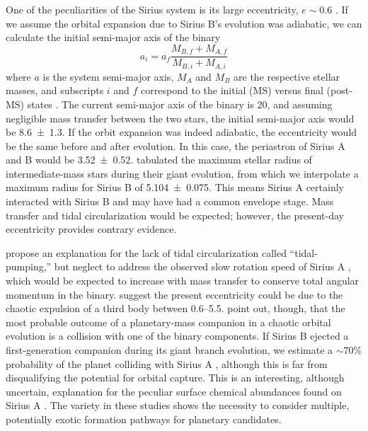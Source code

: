 \documentclass[twocolumn]{aastex631}
\begin{document}
One of the peculiarities of the Sirius system is its large eccentricity, $e\sim0.6$ \citep{bondSiriusSystemIts2017}. If we assume the orbital expansion due to Sirius B's evolution was adiabatic, we can calculate the initial semi-major axis of the binary
\begin{equation}
    a_i = a_f \frac{M_{B,f} + M_{A,f}}{M_{B,i} + M_{A,i}}
\end{equation}
where $a$ is the system semi-major axis, $M_A$ and $M_B$ are the respective stellar masses, and subscripts $i$ and $f$ correspond to the initial (MS) versus final (post-MS) states \citep{jeansCosmogonicProblemsAssociated1924}. The current semi-major axis of the binary is \qty{20}{\au}, and assuming negligible mass transfer between the two stars, the initial semi-major axis would be \qty{8.6\pm1.3}{\au}. If the orbit expansion was indeed adiabatic, the eccentricity would be the same before and after evolution. In this case, the periastron of Sirius A and B would be \qty{3.52\pm0.52}{\au}. \citet{verasPostmainsequencePlanetarySystem2016} tabulated the maximum stellar radius of intermediate-mass stars during their giant evolution, from which we interpolate a maximum radius for Sirius B of \qty{5.104\pm0.075}{\au}. This means Sirius A certainly interacted with Sirius B and may have had a common envelope stage. Mass transfer and tidal circularization would be expected; however, the present-day eccentricity provides contrary evidence.

\citet{bonacicmarinovicOrbitalEccentricitiesBinary2008} propose an explanation for the lack of tidal circularization called ``tidal-pumping,'' but neglect to address the observed slow rotation speed of Sirius A \citep{grayPreciseRotationRates2014,takedaRotationalVelocitySirius2020a}, which would be expected to increase with mass transfer to conserve total angular momentum in the binary. \citet{peretsTripleEvolutionDynamical2012} suggest the present eccentricity could be due to the chaotic expulsion of a third body between \qtyrange{0.6}{5.5}{\solarmass}. \citet{kratterStarHoppersPlanet2012} point out, though, that the most probable outcome of a planetary-mass companion in a chaotic orbital evolution is a collision with one of the binary components. If Sirius B ejected a first-generation companion during its giant branch evolution, we estimate a $\sim$70\% probability of the planet colliding with Sirius A \citep[Fig. 7]{kratterStarHoppersPlanet2012}, although this is far from disqualifying the potential for orbital capture. This is an interesting, although uncertain, explanation for the peculiar surface chemical abundances found on Sirius A \citep{landstreetAbundancesElementsHe2011a,takedaRotationalVelocitySirius2020a}. The variety in these studies shows the necessity to consider multiple, potentially exotic formation pathways for planetary candidates.
\end{document}
